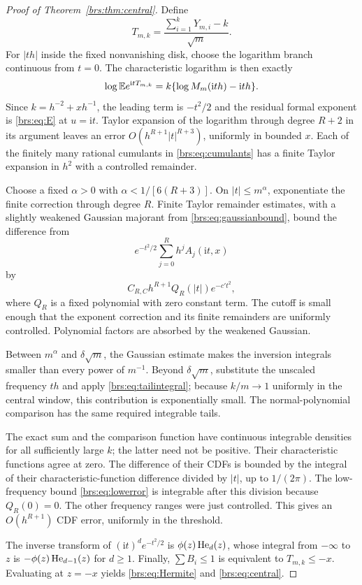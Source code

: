 \documentclass[11pt]{article}
\numberwithin{equation}{section}
\theoremstyle{remark}\newtheorem{remark}[theorem]{Remark}
\newcommand{\ii}{\mathrm i}\newcommand{\sgn}{\operatorname{sgn}}
\begin{document}
\begin{proof}[Proof of Theorem~\ref{brs:thm:central}]
Define
\[
 T_{m,k}=\frac{\sum_{i=1}^kY_{m,i}-k}{\sqrt m}.
\]
For $|th|$ inside the fixed nonvanishing disk, choose the logarithm
branch continuous from $t=0$.  The characteristic logarithm is then exactly
\begin{equation}\label{brs:eq:charlog}
 \log\E e^{\ii tT_{m,k}}=k\{\log M_m(\ii th)-\ii th\}.
\end{equation}
Since $k=h^{-2}+xh^{-1}$, the leading term is $-t^2/2$ and the residual
formal exponent is \eqref{brs:eq:E} at $u=\ii t$.
Taylor expansion of the logarithm through degree $R+2$ in its argument
leaves an error $O(h^{R+1}|t|^{R+3})$, uniformly in bounded $x$.
Each of the finitely many rational cumulants in \eqref{brs:eq:cumulants} has
a finite Taylor expansion in $h^2$ with a controlled remainder.

Choose a fixed $\alpha>0$ with $\alpha<1/[6(R+3)]$.  On
$|t|\leq m^\alpha$, exponentiate the finite correction through degree $R$.
Finite Taylor remainder estimates, with a slightly weakened Gaussian
majorant from \eqref{brs:eq:gaussianbound}, bound the difference from
\[
 e^{-t^2/2}\sum_{j=0}^R h^jA_j(\ii t,x)
\]
by
\begin{equation}\label{brs:eq:lowerror}
 C_{R,C}h^{R+1}Q_R(|t|)e^{-c't^2},
\end{equation}
where $Q_R$ is a fixed polynomial with zero constant term.  The cutoff is
small enough that the exponent correction and its finite remainders are
uniformly controlled.  Polynomial factors are absorbed by the weakened
Gaussian.

Between $m^\alpha$ and $\delta\sqrt m$, the Gaussian estimate makes the
inversion integrals smaller than every power of $m^{-1}$.
Beyond $\delta\sqrt m$, substitute the unscaled frequency $th$ and apply
\eqref{brs:eq:tailintegral}; because $k/m\to1$ uniformly in the central
window, this contribution is exponentially small.  The normal-polynomial
comparison has the same required integrable tails.

The exact sum and the comparison function have continuous integrable
densities for all sufficiently large $k$; the latter need not be positive.
Their characteristic functions agree at zero.  The difference of their
CDFs is bounded by the integral of their characteristic-function
difference divided by $|t|$, up to $1/(2\pi)$.  The low-frequency bound
\eqref{brs:eq:lowerror} is integrable after this division because
$Q_R(0)=0$.  The other frequency ranges were just controlled.  This gives
an $O(h^{R+1})$ CDF error, uniformly in the threshold.

The inverse transform of $(\ii t)^de^{-t^2/2}$ is
$\phi(z)\operatorname{He}_d(z)$, whose integral from $-\infty$ to $z$ is
$-\phi(z)\operatorname{He}_{d-1}(z)$ for $d\geq1$.  Finally,
$\sum B_i\leq1$ is equivalent to $T_{m,k}\leq-x$.
Evaluating at $z=-x$ yields \eqref{brs:eq:Hermite} and
\eqref{brs:eq:central}.
\end{proof}
\end{document}
